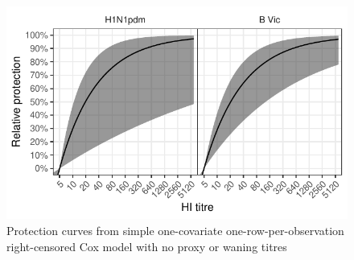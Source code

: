 \documentclass[]{article}
\begin{document}
\begin{figure}
\centering
\includegraphics{../fit-cox-plot/kiddyvaxmain.pdf}
\caption{\label{fig:mycurves}Protection curves from simple one-covariate one-row-per-observation right-censored Cox model with no proxy or waning titres}
\end{figure}
\end{document}
